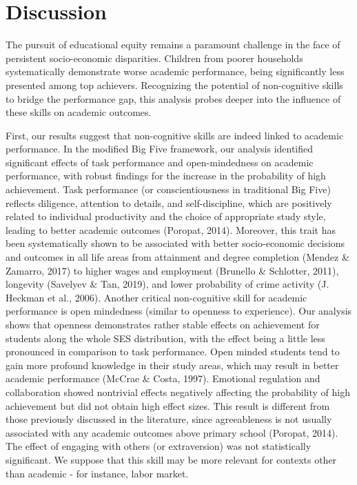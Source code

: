 \documentclass{article}
\begin{document}
\hypertarget{discussion}{%
\section{Discussion}\label{discussion}}

The pursuit of educational equity remains a paramount challenge in the
face of persistent socio-economic disparities. Children from poorer
households systematically demonstrate worse academic performance, being
significantly less presented among top achievers. Recognizing the
potential of non-cognitive skills to bridge the performance gap, this
analysis probes deeper into the influence of these skills on academic
outcomes.

First, our results suggest that non-cognitive skills are indeed linked
to academic performance. In the modified Big Five framework, our
analysis identified significant effects of task performance and
open-mindedness on academic performance, with robust findings for the
increase in the probability of high achievement. Task performance (or
conscientiousness in traditional Big Five) reflects diligence, attention
to details, and self-discipline, which are positively related to
individual productivity and the choice of appropriate study style,
leading to better academic outcomes (Poropat, 2014). Moreover, this
trait has been systematically shown to be associated with better
socio-economic decisions and outcomes in all life areas from attainment
and degree completion (Mendez \& Zamarro, 2017) to higher wages and
employment (Brunello \& Schlotter, 2011), longevity (Savelyev \& Tan,
2019), and lower probability of crime activity (J. Heckman et al.,
2006). Another critical non-cognitive skill for academic performance is
open mindedness (similar to openness to experience). Our analysis shows
that openness demonstrates rather stable effects on achievement for
students along the whole SES distribution, with the effect being a
little less pronounced in comparison to task performance. Open minded
students tend to gain more profound knowledge in their study areas,
which may result in better academic performance (McCrae \& Costa, 1997).
Emotional regulation and collaboration showed nontrivial effects
negatively affecting the probability of high achievement but did not
obtain high effect sizes. This result is different from those previously
discussed in the literature, since agreeableness is not usually
associated with any academic outcomes above primary school (Poropat,
2014). The effect of engaging with others (or extraversion) was not
statistically significant. We suppose that this skill may be more
relevant for contexts other than academic - for instance, labor market.
\end{document}
